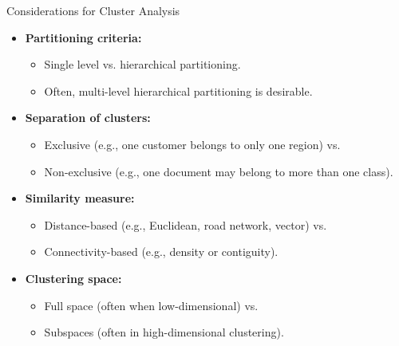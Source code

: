 \begin{frame}{Considerations for Cluster Analysis}
	\begin{itemize}
		\item \textbf{Partitioning criteria:}
		      \begin{itemize}
			      \item Single level vs. hierarchical partitioning.
			      \item Often, multi-level hierarchical partitioning is desirable.
		      \end{itemize}
		\item \textbf{Separation of clusters:}
		      \begin{itemize}
			      \item Exclusive (e.g., one customer belongs to only one region) vs.
			      \item Non-exclusive (e.g., one document may belong to more than one
			            class).
		      \end{itemize}
		\item \textbf{Similarity measure:}
		      \begin{itemize}
			      \item Distance-based (e.g., Euclidean, road network, vector) vs.
			      \item Connectivity-based (e.g., density or contiguity).
		      \end{itemize}
		\item \textbf{Clustering space:}
		      \begin{itemize}
			      \item Full space (often when low-dimensional) vs.
			      \item Subspaces (often in high-dimensional clustering).
		      \end{itemize}
	\end{itemize}
\end{frame}

